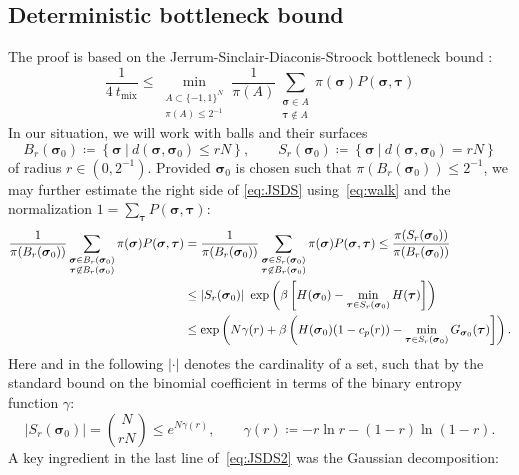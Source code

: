 \documentclass[letterpaper, DIV=17]{scrartcl}
\numberwithin{equation}{section}
\theoremstyle{definition}
\newcommand{\btau}{\boldsymbol{\tau} }
\newcommand{\bsig}{\boldsymbol{\sigma} }
\begin{document}
\subsection{Deterministic bottleneck bound}

The proof is based on the Jerrum-Sinclair-Diaconis-Stroock bottleneck bound \cite[Theorem 7.4]{LY17}:
\begin{equation}\label{eq:JSDS}
    \frac{1}{4\  t_{\textrm{mix}} } \leq \min_{\substack{A \subset \{ -1,1\}^N \\ \pi(A) \leq 2^{-1}}} \frac{1}{\pi(A)} \sum_{\substack{\bsig \in A \\ \btau \not\in A}} \pi(\bsig) P(\bsig,\btau)  
\end{equation}
In our situation, we will work with balls and their surfaces
$$
B_r(\bsig_0) \coloneqq \left\{ \bsig \ | \ d(\bsig , \bsig_0) \leq r N \right\} , \qquad S_r(\bsig_0) \coloneqq \left\{ \bsig \ | \ d(\bsig , \bsig_0) =  r N \right\} 
$$
of radius $ r \in (0,2^{-1}) $. 
Provided $ \bsig_0 $ is chosen such that $ \pi(B_r(\bsig_0) ) \leq 2^{-1}$, we may further estimate the right side of \eqref{eq:JSDS} using~\eqref{eq:walk} and the normalization $ 1 = \sum_{\btau} P(\bsig,\btau) $:
\begin{align}
    \frac{1}{\pi(B_r(\bsig_0))} \sum_{\substack{\bsig \in B_r(\bsig_0) \\ \btau \not\in B_r(\bsig_0)}} \pi(\bsig) P(\bsig,\btau) &=\frac{1}{\pi(B_r(\bsig_0))} \sum_{\substack{\bsig \in S_r(\bsig_0) \\ \btau \not\in B_r(\bsig_0)}} \pi(\bsig) P(\bsig,\btau)  \leq  \frac{\pi(S_r(\bsig_0))}{\pi(B_r(\bsig_0))}  \notag \\
    & \leq \left| S_r(\bsig_0)\right| \ \exp\left(\beta \left[ H(\bsig_0) - \min_{\btau \in S_r(\bsig_0)} H(\btau) \right] \right) \notag \\
    & \leq \exp\left( N \gamma(r) + \beta \left( H(\bsig_0) (1- c_p(r) ) - \min_{\btau \in S_r(\bsig_0)} G_{\bsig_0}(\btau) \right] \right) . \label{eq:JSDS2}
\end{align} 
Here and in the following $ | \cdot | $ denotes the cardinality of a set, such that by the standard bound on the binomial coefficient in terms of the binary entropy function $\gamma $:
\begin{equation}\label{eq:binom}
  \left| S_r(\bsig_0)\right| = \binom{N}{rN} \leq e^{ N \gamma(r) } , \qquad \gamma(r) \coloneqq - r \ln r - (1-r) \ln(1-r) .
\end{equation}
A key ingredient in the last line of~\eqref{eq:JSDS2} was the Gaussian decomposition:
\end{document}
